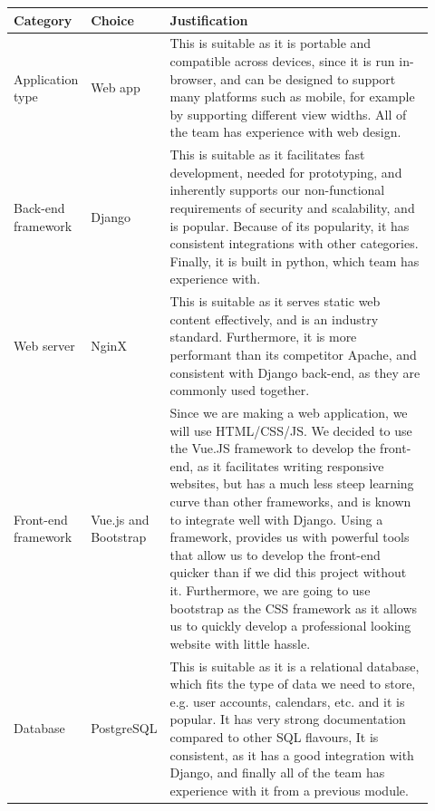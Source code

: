 \documentclass[10pt]{article}
\begin{document}
\begin{longtable}{|p{0.085\linewidth}|p{0.09\linewidth}|p{0.75\linewidth}|}
    \hline \textbf{Category} & \textbf{Choice} & \textbf{Justification} \\ \hline\hline


    Application type
    &
    Web app
    &
    This is suitable as it is portable and compatible across devices, since it
    is run in-browser, and can be designed to support many platforms such as
    mobile, for example by supporting different view widths. All of the team
    has experience with web design.
    \\ \hline

    Back-end framework
    &
    Django \cite{Django}
    &
    This is suitable as it facilitates fast development, needed for prototyping,
    and inherently supports our non-functional requirements of security and
    scalability, and is popular. Because of its popularity, it has consistent
    integrations with other categories. Finally, it is built in python, which
    team has experience with.
    \\ \hline

    Web server
    &
    NginX \cite{NginX}
    &
    This is suitable as it serves static web content effectively, and is an
    industry standard. Furthermore, it is more performant than its competitor
    Apache, and consistent with Django back-end, as they are commonly used
    together.
    \\ \hline

    Front-end framework
    &
    Vue.js \cite{Vue} and Bootstrap \cite{Bootstrap}
    &
    Since we are making a web application, we will use HTML/CSS/JS. We decided
    to use the Vue.JS framework to develop the front-end, as it facilitates
    writing responsive websites, but has a much less steep learning curve than
    other frameworks, and is known to integrate well with Django. Using a
    framework, provides us with powerful tools that allow us to develop the
    front-end quicker than if we did this project without it. Furthermore, we are
    going to use bootstrap as the CSS framework as it allows us to quickly
    develop a professional looking website with little hassle.
    \\ \hline

    Database
    &
    PostgreSQL \cite{PostgreSQL}
    &
    This is suitable as it is a relational database, which fits the type of data
    we need to store, e.g. user accounts, calendars, etc. and it is popular. It
    has very strong documentation compared to other SQL flavours, It is
    consistent, as it has a good integration with Django, and finally all of the
    team has experience with it from a previous module.
    \\ \hline


\end{longtable}
\end{document}
